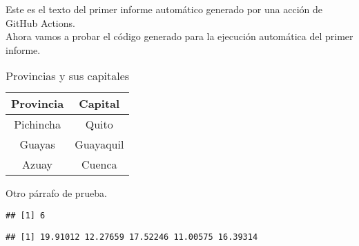 Este es el texto del primer informe automático generado por una acción de GitHub Actions.\\

Ahora vamos a probar el código generado para la ejecución automática del primer informe.

\begin{table}[H]
\centering
\begin{tabular}{|c|c|}\hline
\textbf{Provincia} & \textbf{Capital} \\ \hline
Pichincha & Quito \\ \hline
Guayas & Guayaquil \\ \hline
Azuay & Cuenca \\ \hline
\end{tabular}
\caption{Provincias y sus capitales}
\end{table}

Otro párrafo de prueba.
\begin{knitrout}
\color{fgcolor}\begin{kframe}
\begin{alltt}
\hlopt{+}\hlopt{-}
\end{alltt}
\begin{verbatim}
## [1] 6
\end{verbatim}
\begin{alltt}
\hldef{(}\hldef{,} \hldef{=} \hldef{,}  \hldef{=}  \hldef{)}
\end{alltt}
\begin{verbatim}
## [1] 19.91012 12.27659 17.52246 11.00575 16.39314
\end{verbatim}
\end{kframe}
\end{knitrout}


